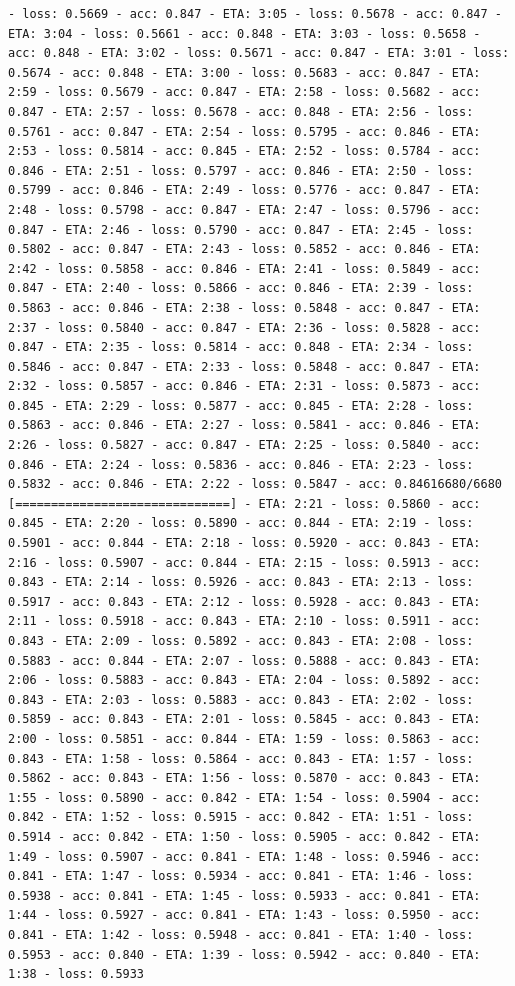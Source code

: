 \documentclass[11pt]{article}
\begin{document}
\begin{Verbatim}[commandchars=\\\{\}]
- loss: 0.5669 - acc: 0.847 - ETA: 3:05 - loss: 0.5678 - acc: 0.847 - ETA: 3:04 - loss: 0.5661 - acc: 0.848 - ETA: 3:03 - loss: 0.5658 - acc: 0.848 - ETA: 3:02 - loss: 0.5671 - acc: 0.847 - ETA: 3:01 - loss: 0.5674 - acc: 0.848 - ETA: 3:00 - loss: 0.5683 - acc: 0.847 - ETA: 2:59 - loss: 0.5679 - acc: 0.847 - ETA: 2:58 - loss: 0.5682 - acc: 0.847 - ETA: 2:57 - loss: 0.5678 - acc: 0.848 - ETA: 2:56 - loss: 0.5761 - acc: 0.847 - ETA: 2:54 - loss: 0.5795 - acc: 0.846 - ETA: 2:53 - loss: 0.5814 - acc: 0.845 - ETA: 2:52 - loss: 0.5784 - acc: 0.846 - ETA: 2:51 - loss: 0.5797 - acc: 0.846 - ETA: 2:50 - loss: 0.5799 - acc: 0.846 - ETA: 2:49 - loss: 0.5776 - acc: 0.847 - ETA: 2:48 - loss: 0.5798 - acc: 0.847 - ETA: 2:47 - loss: 0.5796 - acc: 0.847 - ETA: 2:46 - loss: 0.5790 - acc: 0.847 - ETA: 2:45 - loss: 0.5802 - acc: 0.847 - ETA: 2:43 - loss: 0.5852 - acc: 0.846 - ETA: 2:42 - loss: 0.5858 - acc: 0.846 - ETA: 2:41 - loss: 0.5849 - acc: 0.847 - ETA: 2:40 - loss: 0.5866 - acc: 0.846 - ETA: 2:39 - loss: 0.5863 - acc: 0.846 - ETA: 2:38 - loss: 0.5848 - acc: 0.847 - ETA: 2:37 - loss: 0.5840 - acc: 0.847 - ETA: 2:36 - loss: 0.5828 - acc: 0.847 - ETA: 2:35 - loss: 0.5814 - acc: 0.848 - ETA: 2:34 - loss: 0.5846 - acc: 0.847 - ETA: 2:33 - loss: 0.5848 - acc: 0.847 - ETA: 2:32 - loss: 0.5857 - acc: 0.846 - ETA: 2:31 - loss: 0.5873 - acc: 0.845 - ETA: 2:29 - loss: 0.5877 - acc: 0.845 - ETA: 2:28 - loss: 0.5863 - acc: 0.846 - ETA: 2:27 - loss: 0.5841 - acc: 0.846 - ETA: 2:26 - loss: 0.5827 - acc: 0.847 - ETA: 2:25 - loss: 0.5840 - acc: 0.846 - ETA: 2:24 - loss: 0.5836 - acc: 0.846 - ETA: 2:23 - loss: 0.5832 - acc: 0.846 - ETA: 2:22 - loss: 0.5847 - acc: 0.84616680/6680 [==============================] - ETA: 2:21 - loss: 0.5860 - acc: 0.845 - ETA: 2:20 - loss: 0.5890 - acc: 0.844 - ETA: 2:19 - loss: 0.5901 - acc: 0.844 - ETA: 2:18 - loss: 0.5920 - acc: 0.843 - ETA: 2:16 - loss: 0.5907 - acc: 0.844 - ETA: 2:15 - loss: 0.5913 - acc: 0.843 - ETA: 2:14 - loss: 0.5926 - acc: 0.843 - ETA: 2:13 - loss: 0.5917 - acc: 0.843 - ETA: 2:12 - loss: 0.5928 - acc: 0.843 - ETA: 2:11 - loss: 0.5918 - acc: 0.843 - ETA: 2:10 - loss: 0.5911 - acc: 0.843 - ETA: 2:09 - loss: 0.5892 - acc: 0.843 - ETA: 2:08 - loss: 0.5883 - acc: 0.844 - ETA: 2:07 - loss: 0.5888 - acc: 0.843 - ETA: 2:06 - loss: 0.5883 - acc: 0.843 - ETA: 2:04 - loss: 0.5892 - acc: 0.843 - ETA: 2:03 - loss: 0.5883 - acc: 0.843 - ETA: 2:02 - loss: 0.5859 - acc: 0.843 - ETA: 2:01 - loss: 0.5845 - acc: 0.843 - ETA: 2:00 - loss: 0.5851 - acc: 0.844 - ETA: 1:59 - loss: 0.5863 - acc: 0.843 - ETA: 1:58 - loss: 0.5864 - acc: 0.843 - ETA: 1:57 - loss: 0.5862 - acc: 0.843 - ETA: 1:56 - loss: 0.5870 - acc: 0.843 - ETA: 1:55 - loss: 0.5890 - acc: 0.842 - ETA: 1:54 - loss: 0.5904 - acc: 0.842 - ETA: 1:52 - loss: 0.5915 - acc: 0.842 - ETA: 1:51 - loss: 0.5914 - acc: 0.842 - ETA: 1:50 - loss: 0.5905 - acc: 0.842 - ETA: 1:49 - loss: 0.5907 - acc: 0.841 - ETA: 1:48 - loss: 0.5946 - acc: 0.841 - ETA: 1:47 - loss: 0.5934 - acc: 0.841 - ETA: 1:46 - loss: 0.5938 - acc: 0.841 - ETA: 1:45 - loss: 0.5933 - acc: 0.841 - ETA: 1:44 - loss: 0.5927 - acc: 0.841 - ETA: 1:43 - loss: 0.5950 - acc: 0.841 - ETA: 1:42 - loss: 0.5948 - acc: 0.841 - ETA: 1:40 - loss: 0.5953 - acc: 0.840 - ETA: 1:39 - loss: 0.5942 - acc: 0.840 - ETA: 1:38 - loss: 0.5933 
\end{Verbatim}
\end{document}
